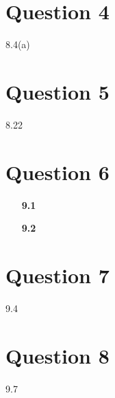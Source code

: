 \documentclass{article}
\begin{document}

\section*{Question 4}
8.4(a)




\section*{Question 5}
8.22



\section*{Question 6}
\begin{itemize}
	\item[\textbf{9.1}] 
	
	
	\item[\textbf{9.2}] 
	
\end{itemize}



\section*{Question 7}
9.4


\section*{Question 8}
9.7

\end{document}
